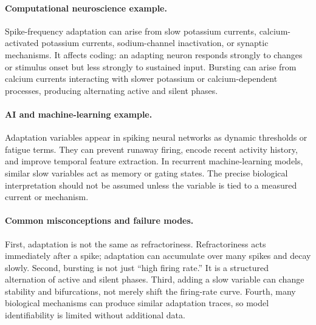 \paragraph{Computational neuroscience example.}
Spike-frequency adaptation can arise from slow potassium currents, calcium-activated potassium currents, sodium-channel inactivation, or synaptic mechanisms. It affects coding: an adapting neuron responds strongly to changes or stimulus onset but less strongly to sustained input. Bursting can arise from calcium currents interacting with slower potassium or calcium-dependent processes, producing alternating active and silent phases.

\paragraph{AI and machine-learning example.}
Adaptation variables appear in spiking neural networks as dynamic thresholds or fatigue terms. They can prevent runaway firing, encode recent activity history, and improve temporal feature extraction. In recurrent machine-learning models, similar slow variables act as memory or gating states. The precise biological interpretation should not be assumed unless the variable is tied to a measured current or mechanism.

\paragraph{Common misconceptions and failure modes.}
First, adaptation is not the same as refractoriness. Refractoriness acts immediately after a spike; adaptation can accumulate over many spikes and decay slowly. Second, bursting is not just ``high firing rate.'' It is a structured alternation of active and silent phases. Third, adding a slow variable can change stability and bifurcations, not merely shift the firing-rate curve. Fourth, many biological mechanisms can produce similar adaptation traces, so model identifiability is limited without additional data.

